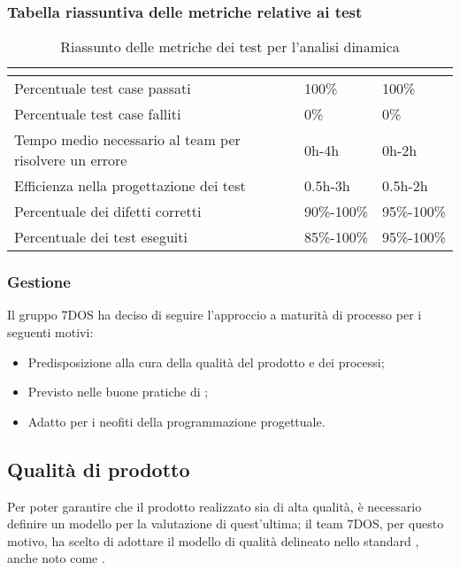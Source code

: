 \subsubsection{Tabella riassuntiva delle metriche relative ai test}
\renewcommand{\arraystretch}{1.5}
\begin{table}[H]
	\centering
	\begin{tabular}{|C{5cm}|C{4cm}|C{4cm}|}
		\hline
		\textbf{\color{title_text}{Nome Metrica}} &  \textbf{\color{title_text}{Range accettabile}} & \textbf{\color{title_text}{Range ottimale}} \\ \hline
		Percentuale test case passati & 100\%  & 100\% \\ \hline
		Percentuale test case falliti & 0\% & 0\% \\ \hline
		Tempo medio necessario al team per risolvere un errore & 0h-4h & 0h-2h \\ \hline
		Efficienza nella progettazione dei test & 0.5h-3h & 0.5h-2h \\ \hline
		Percentuale dei difetti corretti & 90\%-100\% & 95\%-100\% \\ \hline
		Percentuale dei test eseguiti & 85\%-100\% & 95\%-100\% \\ \hline
	\end{tabular}
	\caption{Riassunto delle metriche dei test per l'analisi dinamica}
	\label{tabella:riassunto metriche dei test per l'analisi dinamica}
\end{table}
\renewcommand{\arraystretch}{1}

\subsubsection{Gestione}
	Il gruppo 7DOS ha deciso di seguire l'approccio a maturità di processo per i seguenti motivi:
	\begin{itemize}
	\item Predisposizione alla cura della qualità del prodotto e dei processi;
	\item Previsto nelle buone pratiche di ;
	\item Adatto per i neofiti della programmazione progettuale.
	\end{itemize}

\subsection{Qualità di prodotto}
Per poter garantire che il prodotto realizzato sia di alta qualità, è necessario definire un modello per la valutazione di quest'ultima; il team 7DOS, per questo motivo, ha scelto di adottare il modello di qualità delineato nello standard , anche noto come .

